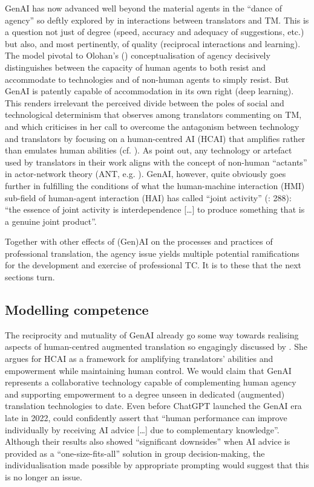 \documentclass[output=paper]{langscibook}
\begin{document}
GenAI has now advanced well beyond the material agents in the “dance of agency” so deftly explored by \citet[342]{olohan_translators_2011} in interactions between translators and TM. This is a question not just of degree (speed, accuracy and adequacy of suggestions, etc.) but also, and most pertinently, of quality (reciprocal interactions and learning). The model pivotal to Olohan’s (\citeyear[344]{olohan_translators_2011}) conceptualisation of agency decisively distinguishes between the capacity of human agents to both resist and accommodate to technologies and of non-human agents to simply resist. But GenAI is patently capable of accommodation in its own right (deep learning). This renders irrelevant the perceived divide between the poles of social and technological determinism that \citet[345]{olohan_translators_2011} observes among translators commenting on TM, and which \citet{obrien_human-centered_2024} criticises in her call to overcome the antagonism between technology and translators by focusing on a human-centred AI (HCAI) that amplifies rather than emulates human abilities (cf. \citealt{shneiderman_human_2020}). As \citet[36--37]{risku_extended_2013} point out, any technology or artefact used by translators in their work aligns with the concept of non-human “actants” in actor-network theory (ANT, e.g. \citealt{latour_reassembling_2005}). GenAI, however, quite obviously goes further in fulfilling the conditions of what the human-machine interaction (HMI) sub-field of human-agent interaction (HAI) has called “joint activity” (\citealt{bradshaw_human-agent_2011}: 288): “the essence of joint activity is interdependence […] to produce something that is a genuine joint product”.

Together with other effects of (Gen)AI on the processes and practices of professional translation, the agency issue yields multiple potential ramifications for the development and exercise of professional TC. It is to these that the next sections turn.

\subsection{Modelling competence}

The reciprocity and mutuality of GenAI already go some way towards realising aspects of human-centred augmented translation so engagingly discussed by \citet{obrien_human-centered_2024}. She argues for HCAI as a framework for amplifying translators’ abilities and empowerment while maintaining human control. We would claim that GenAI represents a collaborative technology capable of complementing human agency and supporting empowerment to a degree unseen in dedicated (augmented) translation technologies to date. Even before ChatGPT launched the GenAI era late in 2022, \citet[1552]{fugener_will_2021} could confidently assert that “human performance can improve individually by receiving AI advice […] due to complementary knowledge”. Although their results also showed “significant downsides” when AI advice is provided as a “one-size-fits-all” solution in group decision-making, the individualisation made possible by appropriate prompting would suggest that this is no longer an issue.
\end{document}
